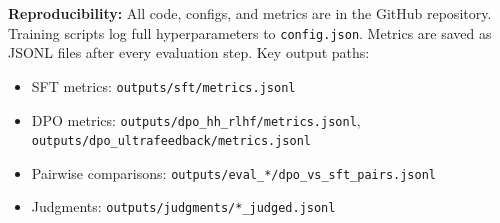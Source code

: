 \documentclass[11pt,a4paper]{article}
\begin{document}
\textbf{Reproducibility:} All code, configs, and metrics are in the GitHub repository. Training scripts log full hyperparameters to \texttt{config.json}. Metrics are saved as JSONL files after every evaluation step. Key output paths:
\begin{itemize}
    \item SFT metrics: \texttt{outputs/sft/metrics.jsonl}
    \item DPO metrics: \texttt{outputs/dpo\_hh\_rlhf/metrics.jsonl}, \texttt{outputs/dpo\_ultrafeedback/metrics.jsonl}
    \item Pairwise comparisons: \texttt{outputs/eval\_*/dpo\_vs\_sft\_pairs.jsonl}
    \item Judgments: \texttt{outputs/judgments/*\_judged.jsonl}
\end{itemize}
\end{document}
